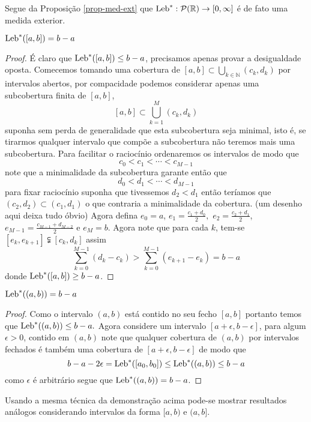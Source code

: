 Segue da Proposição \ref{prop-med-ext} que 
$\textnormal{Leb}^{*}:\mathcal{P}(\mathbb{R})\to[0,\infty]$ é de fato uma medida exterior.

\begin{lema}\label{LEB 2}
$\textnormal{Leb}^{*}([a,b])=b-a$
\end{lema}

\begin{proof}
É claro que $\textnormal{Leb}^{*}([a,b])\leq b-a$, 
precisamos apenas provar a desigualdade oposta. 
Comecemos tomando uma cobertura de 
$[a,b]\subset \bigcup_{k\in \mathbb{N}} (c_k,d_k)$  
por intervalos abertos, por compacidade podemos considerar 
apenas uma subcobertura finita de $[a,b]$, 
$$
[a,b]\subset \bigcup_{k=1}^M(c_k,d_k)
$$
suponha sem perda de generalidade que esta subcobertura seja minimal, 
isto é, se tirarmos qualquer intervalo que compõe a subcobertura 
não teremos mais uma subcobertura. Para facilitar o raciocínio 
ordenaremos os intervalos de modo que 
$$
c_0<c_1<\cdots<c_{M-1}
$$
note que a minimalidade da subcobertura garante então que 
$$
d_0<d_1<\cdots<d_{M-1}
$$
para fixar raciocínio  suponha que tivessemos $d_2<d_1$ 
então teríamos que $(c_2,d_2)\subset (c_1,d_1)$ o 
que contraria a minimalidade da cobertura. 
({\red um desenho aqui deixa tudo óbvio}) 
Agora defina 
$e_0=a$, $e_1=\frac{c_1+d_0}{2},$ $e_2=\frac{c_2+d_1}{2}$,
$e_{M-1}=\frac{c_{M-1}+d_{M-2}}{2}$ e $e_{M}=b.$  
Agora note que  para cada $k$, 
tem-se $[e_k,e_{k+1}]\subsetneqq [c_k,d_k]$ assim 
$$
\sum_{k=0}^{M-1} (d_k-c_k)>\sum_{k=0}^{M-1} (e_{k+1}-e_k)=b-a
$$ 
donde $\textnormal{Leb}^{*}([a,b])\geq b-a$.

\end{proof}

\begin{lema}

$\textnormal{Leb}^{*}((a,b))=b-a$
\end{lema}


\begin{proof}
Como o intervalo $(a,b)$ está contido no seu 
fecho $[a,b]$ portanto temos que  $\textnormal{Leb}^{*}((a,b))\leq b-a.$ 
Agora considere um intervalo $[a+\epsilon,b-\epsilon]$,
para algum $\epsilon>0$, 
contido em $(a,b)$ note que qualquer cobertura de 
$(a,b)$ por intervalos fechados é também uma cobertura 
de $[a+\epsilon,b-\epsilon]$ de modo que 
$$
b-a-2\epsilon= \textnormal{Leb}^{*}([a_0,b_0])\leq  \textnormal{Leb}^{*}((a,b))\leq b-a
$$
como $\epsilon$ é arbitrário segue que  $\textnormal{Leb}^{*}((a,b))=b-a$.
\end{proof}
Usando a mesma técnica da demonstração acima pode-se mostrar 
resultados análogos considerando intervalos  
da forma $[a,b)$ e $(a,b]$.





